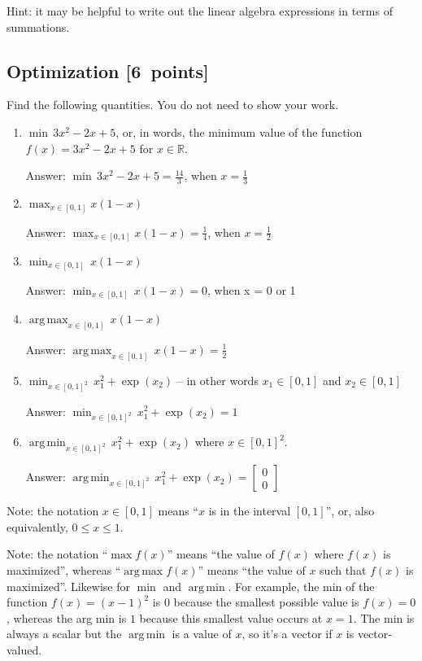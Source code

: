 \documentclass{article}
\newcommand{\blu}[1]{{\textcolor{blu}{#1}}}
\newcommand{\gre}[1]{\textcolor{gre}{#1}}
\newcommand\ans[1]{\par\gre{Answer: #1}}
\newenvironment{answer}{\par\begingroup\color{gre}Answer: }{\endgroup}
\let\ask\blu
\newcommand\pts[1]{\textcolor{pointscolour}{[#1~points]}}
\def\R{\mathbb{R}}
\DeclareMathOperator*{\argmax}{arg\,max}
\DeclareMathOperator*{\argmin}{arg\,min}
\begin{document}
  Hint: it may be helpful to write out the linear algebra expressions in terms of summations.


  \subsection{Optimization \pts{6}}

  \ask{Find the following quantities.} You do not need to show your work.

  \begin{enumerate}
  \item $\min \, 3x^2-2x+5$, or, in words, the minimum value of the function $f(x) = 3x^2 -2x + 5$ for $x \in \R$.
  \begin{answer}
  $\min \, 3x^2-2x+5 = \frac{14}{3}$, when $x = \frac{1}{3}$
  \end{answer}
  \item $\max_{x \in [0, 1]} x(1-x)$
  \begin{answer}
  $\max_{x \in [0, 1]} x(1-x) = \frac{1}{4}$, when $x = \frac{1}{2}$
  \end{answer}
  \item $\min_{x \in [0, 1]} \, x(1-x)$
  \begin{answer}
  $\min_{x \in [0, 1]} \, x(1-x) = 0$, when x = 0 or 1
  \end{answer}
  \item $\argmax_{x \in [0,1]} \, x(1-x)$
  \ans{$\argmax_{x \in [0,1]} \, x(1-x) = \frac{1}{2}$}
  \item $\min_{x \in [0, 1]^2} \, x_1^2 + \exp(x_2)$ -- in other words $x_1\in [0,1]$ and $x_2\in [0,1]$
  \ans{$\min_{x \in [0, 1]^2} \, x_1^2 + \exp(x_2) = 1$}
  \item $\argmin_{x \in [0,1]^2} \, x_1^2 + \exp(x_2)$ where $x \in [0,1]^2$.
  \ans{$\argmin_{x \in [0,1]^2} \, x_1^2 + \exp(x_2) = \left[\begin{array}{cc}
       0  \\
       0 
  \end{array}\right]$}
  \end{enumerate}

  Note: the notation $x\in [0,1]$ means ``$x$ is in the interval $[0,1]$'', or, also equivalently, $0 \leq x \leq 1$.

  Note: the notation ``$\max f(x)$'' means ``the value of $f(x)$ where $f(x)$ is maximized'', whereas ``$\argmax  f(x)$'' means ``the value of $x$ such that $f(x)$ is maximized''.
  Likewise for $\min$ and $\argmin$. For example, the min of the function $f(x)=(x-1)^2$ is $0$ because the smallest possible value is $f(x)=0$,
  whereas the arg min is $1$ because this smallest value occurs at $x=1$. The min is always a scalar but the $\argmin$ is a value of $x$, so it's a vector
  if $x$ is vector-valued.
\end{document}
